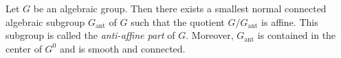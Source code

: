     \begin{theorem}\label{thm:Rosenlicht_decomposition}
        Let \(G\) be an algebraic group.
        Then there exists a smallest normal connected algebraic subgroup \(G_{\text{ant}}\) of \(G\) such that the quotient \(G/G_{\text{ant}}\) is affine.
        This subgroup is called the \emph{anti-affine part} of \(G\).
        Moreover, \(G_{\text{ant}}\) is contained in the center of \(G^0\) and is smooth and connected.
    \end{theorem}